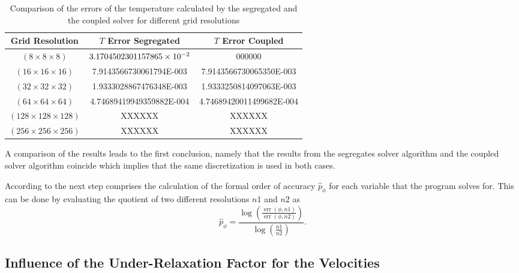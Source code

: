\begin{table}[h!]
    \doublespacing
    \centering \begin{tabular}{ |c|c|c| }
    \hline
    Grid Resolution & \(T\) Error Segregated & \(T\) Error Coupled \\ \hline
  \((8\times8\times8)\)        &  \(3.1704502301157865\times 10^{-2}\)  &  000000 \\ \hline 
    \((16\times16\times16)\)     &  7.9143566730061794E-003  &  7.9143566730065350E-003 \\ \hline
    \((32\times32\times32)\)     &  1.9333028867476348E-003  &  1.9333250814097063E-003 \\ \hline
    \((64\times64\times64)\)     &  4.74689419949359882E-004 &  4.74689420011499682E-004 \\ \hline
    \((128\times128\times128)\)  &  XXXXXX & XXXXXX \\ \hline
    \((256\times256\times256)\)  &  XXXXXX & XXXXXX \\ \hline
    \end{tabular}
    \caption{Comparison of the errors of the temperature calculated by the segregated and the coupled solver for different grid resolutions}
    \label{tab:fehler}
\end{table}

A comparison of the results leads to the first conclusion, namely that the results from the segregates solver algorithm and the coupled solver algorithm coincide which implies that the same discretization is used in both cases.

According to \cite{salari00} the next step comprises the calculation of the formal order of accuracy \(\hat{p}_\phi\) for each variable that the program solves for. This can be done by evaluating the quotient of two different resolutions \(n1\) and \(n2\) as 
\begin{displaymath}
  \hat{p}_{\phi} = \frac{\log\left(\frac{\operatorname{err}(\phi,{n1})}{\operatorname{err}(\phi,{n2})}\right)}{\log\left(\frac{n1}{n2}\right)}.
\end{displaymath}

\subsection{Influence of the Under-Relaxation Factor for the Velocities}
\label{sec:independence}

